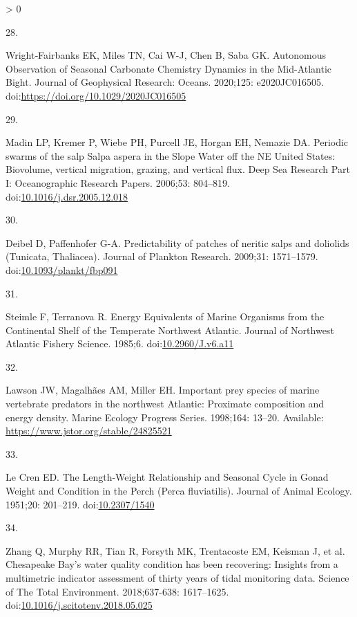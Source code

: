 \documentclass[
  10pt,
]{article}
\newlength{\cslhangindent}
\newlength{\csllabelwidth}
\newenvironment{CSLReferences}[2] %
 {%
  \setlength{\parindent}{0pt}
  \ifodd #1 \everypar{\setlength{\hangindent}{\cslhangindent}}\ignorespaces\fi
  \ifnum #2 > 0
  \setlength{\parskip}{#2\baselineskip}
  \fi
 }%
 {}
\newcommand{\CSLLeftMargin}[1]{\parbox[t]{\csllabelwidth}{#1}}
\newcommand{\CSLRightInline}[1]{\parbox[t]{\linewidth - \csllabelwidth}{#1}\break}
\begin{document}
\begin{CSLReferences}{0}{0}
\leavevmode\hypertarget{ref-wrightfairbanks_autonomous_2020}{}%
\CSLLeftMargin{28. }
\CSLRightInline{Wright‐Fairbanks EK, Miles TN, Cai W-J, Chen B, Saba GK.
Autonomous {Observation} of {Seasonal} {Carbonate} {Chemistry}
{Dynamics} in the {Mid}-{Atlantic} {Bight}. Journal of Geophysical
Research: Oceans. 2020;125: e2020JC016505.
doi:\url{https://doi.org/10.1029/2020JC016505}}

\leavevmode\hypertarget{ref-madin_periodic_2006}{}%
\CSLLeftMargin{29. }
\CSLRightInline{Madin LP, Kremer P, Wiebe PH, Purcell JE, Horgan EH,
Nemazie DA. Periodic swarms of the salp {Salpa} aspera in the {Slope}
{Water} off the {NE} {United} {States}: {Biovolume}, vertical migration,
grazing, and vertical flux. Deep Sea Research Part I: Oceanographic
Research Papers. 2006;53: 804--819.
doi:\href{https://doi.org/10.1016/j.dsr.2005.12.018}{10.1016/j.dsr.2005.12.018}}

\leavevmode\hypertarget{ref-deibel_predictability_2009}{}%
\CSLLeftMargin{30. }
\CSLRightInline{Deibel D, Paffenhofer G-A. Predictability of patches of
neritic salps and doliolids ({Tunicata}, {Thaliacea}). Journal of
Plankton Research. 2009;31: 1571--1579.
doi:\href{https://doi.org/10.1093/plankt/fbp091}{10.1093/plankt/fbp091}}

\leavevmode\hypertarget{ref-steimle_energy_1985}{}%
\CSLLeftMargin{31. }
\CSLRightInline{Steimle F, Terranova R. Energy {Equivalents} of {Marine}
{Organisms} from the {Continental} {Shelf} of the {Temperate}
{Northwest} {Atlantic}. Journal of Northwest Atlantic Fishery Science.
1985;6. doi:\href{https://doi.org/10.2960/J.v6.a11}{10.2960/J.v6.a11}}

\leavevmode\hypertarget{ref-lawson_important_1998}{}%
\CSLLeftMargin{32. }
\CSLRightInline{Lawson JW, Magalhães AM, Miller EH. Important prey
species of marine vertebrate predators in the northwest {Atlantic}:
Proximate composition and energy density. Marine Ecology Progress
Series. 1998;164: 13--20. Available:
\url{https://www.jstor.org/stable/24825521}}

\leavevmode\hypertarget{ref-le_cren_length-weight_1951}{}%
\CSLLeftMargin{33. }
\CSLRightInline{Le Cren ED. The {Length}-{Weight} {Relationship} and
{Seasonal} {Cycle} in {Gonad} {Weight} and {Condition} in the {Perch}
({Perca} fluviatilis). Journal of Animal Ecology. 1951;20: 201--219.
doi:\href{https://doi.org/10.2307/1540}{10.2307/1540}}

\leavevmode\hypertarget{ref-zhang_chesapeake_2018}{}%
\CSLLeftMargin{34. }
\CSLRightInline{Zhang Q, Murphy RR, Tian R, Forsyth MK, Trentacoste EM,
Keisman J, et al. Chesapeake {Bay}'s water quality condition has been
recovering: {Insights} from a multimetric indicator assessment of thirty
years of tidal monitoring data. Science of The Total Environment.
2018;637-638: 1617--1625.
doi:\href{https://doi.org/10.1016/j.scitotenv.2018.05.025}{10.1016/j.scitotenv.2018.05.025}}


\end{CSLReferences}
\end{document}
